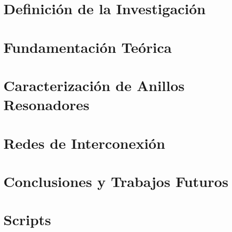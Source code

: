 
\makeindex



    
    
    

    \tableofcontents
    \listoffigures
    \listoftables
    \lstlistoflistings    

    \chapter{Definición de la Investigación}
        
 
    \chapter{Fundamentación Teórica}
    \label{ch:intro}
    
    
    
    
    \chapter{Caracterización de Anillos Resonadores}
    \label{ch:rr}

    
    
    

    \chapter{Redes de Interconexión}
    
    

    \chapter{Conclusiones y Trabajos Futuros}

    \appendix
    \chapter{Scripts}
    \label{ch:rr_scripts}
    

    
    


